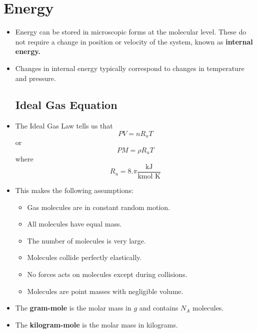 \section{Energy}
\begin{itemize}
    \item Energy can be stored in microscopic forms at the molecular level. These do not require a change in position or velocity of the system, known as \textbf{internal energy.}
    \item Changes in internal energy typically correspond to changes in temperature and pressure.
          \subsection{Ideal Gas Equation}
    \item The Ideal Gas Law tells us that
          \begin{equation}
              PV = nR_uT
          \end{equation}
          or
          \begin{equation}
              PM = \rho R_uT
          \end{equation}
          where
          \begin{equation}
              R_u = 8.\pi \frac{\text{kJ}}{\text{kmol K}}
          \end{equation}
    \item This makes the following assumptions:
          \begin{itemize}
              \item Gas molecules are in constant random motion.
              \item All molecules have equal mass.
              \item The number of molecules is very large.
              \item Molecules collide perfectly elastically.
              \item No forces acts on molecules except during collisions.
              \item Molecules are point masses with negligible volume.
          \end{itemize}
    \item The \textbf{gram-mole} is the molar mass in $g$ and contains $N_A$ molecules.
    \item The \textbf{kilogram-mole} is the molar mass in kilograms.

\end{itemize}
